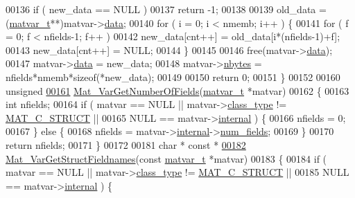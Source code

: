 \begin{DoxyCode}
00136     \textcolor{keywordflow}{if} ( new\_data == NULL )
00137         \textcolor{keywordflow}{return} -1;
00138 
00139     old\_data = (\hyperlink{group___m_a_t_structmatvar__t}{matvar\_t}**)matvar->\hyperlink{group___m_a_t_a5672978efa230bbdecdf38ede781f7fa}{data};
00140     for ( i = 0; i < nmemb; i++ ) \{
00141         \textcolor{keywordflow}{for} ( f = 0; f < nfields-1; f++ )
00142             new\_data[cnt++] = old\_data[i*(nfields-1)+f];
00143         new\_data[cnt++] = NULL;
00144     \}
00145 
00146     free(matvar->\hyperlink{group___m_a_t_a5672978efa230bbdecdf38ede781f7fa}{data});
00147     matvar->\hyperlink{group___m_a_t_a5672978efa230bbdecdf38ede781f7fa}{data} = new\_data;
00148     matvar->\hyperlink{group___m_a_t_abf1c844540503be2df9bb3db93cfe307}{nbytes} = nfields*nmemb*\textcolor{keyword}{sizeof}(*new\_data);
00149 
00150     \textcolor{keywordflow}{return} 0;
00151 \}
00152 
00160 \textcolor{keywordtype}{unsigned}
\hyperlink{group___m_a_t_ga06ba20aa758543d53dc83a1ccbdc2efc}{00161} \hyperlink{group___m_a_t_ga06ba20aa758543d53dc83a1ccbdc2efc}{Mat\_VarGetNumberOfFields}(\hyperlink{group___m_a_t_structmatvar__t}{matvar\_t} *matvar)
00162 \{
00163     \textcolor{keywordtype}{int} nfields;
00164     \textcolor{keywordflow}{if} ( matvar == NULL || matvar->\hyperlink{group___m_a_t_aff13035bf3265dd7d9425e5d40c839d4}{class\_type} != \hyperlink{group___m_a_t_ggad4d60ae7b709fc81bfd744fb4c857c40acb467c7749c80902b798134c729bb521}{MAT\_C\_STRUCT}   ||
00165         NULL == matvar->\hyperlink{group___m_a_t_a6e97e3ed9f40c49322c18561c2a94e92}{internal} ) \{
00166         nfields = 0;
00167     \} \textcolor{keywordflow}{else} \{
00168         nfields = matvar->\hyperlink{group___m_a_t_a6e97e3ed9f40c49322c18561c2a94e92}{internal}->\hyperlink{structmatvar__internal_a93fc447484f455eddf9334f2e9e411c2}{num\_fields};
00169     \}
00170     \textcolor{keywordflow}{return} nfields;
00171 \}
00172 
00181 \textcolor{keywordtype}{char} * \textcolor{keyword}{const} *
\hyperlink{group___m_a_t_ga88bc328e59ce1dd8f43e917c07140803}{00182} \hyperlink{group___m_a_t_ga88bc328e59ce1dd8f43e917c07140803}{Mat\_VarGetStructFieldnames}(\textcolor{keyword}{const} \hyperlink{group___m_a_t_structmatvar__t}{matvar\_t} *matvar)
00183 \{
00184     \textcolor{keywordflow}{if} ( matvar == NULL || matvar->\hyperlink{group___m_a_t_aff13035bf3265dd7d9425e5d40c839d4}{class\_type} != \hyperlink{group___m_a_t_ggad4d60ae7b709fc81bfd744fb4c857c40acb467c7749c80902b798134c729bb521}{MAT\_C\_STRUCT}   ||
00185         NULL == matvar->\hyperlink{group___m_a_t_a6e97e3ed9f40c49322c18561c2a94e92}{internal} ) \{

\end{DoxyCode}
